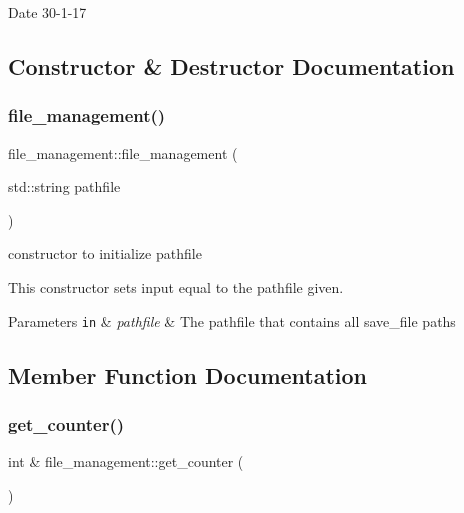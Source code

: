 \begin{DoxyDate}{Date}
30-\/1-\/17 
\end{DoxyDate}


\subsection{Constructor \& Destructor Documentation}
\mbox{\label{classfile__management_ae3d7ca2804b44e05efc2ddc79c9d514d}} 
\subsubsection{\texorpdfstring{file\+\_\+management()}{file\_management()}}
{\footnotesize\ttfamily file\+\_\+management\+::file\+\_\+management (\begin{DoxyParamCaption}\item[{std\+::string}]{pathfile }\end{DoxyParamCaption})}



constructor to initialize pathfile 

This constructor sets input equal to the pathfile given.


\begin{DoxyParams}[1]{Parameters}
\mbox{\tt in}  & {\em pathfile} & The pathfile that contains all save\+\_\+file paths \\
\hline
\end{DoxyParams}


\subsection{Member Function Documentation}
\mbox{\label{classfile__management_ae6291547fab57a5b861c52e970175854}} 
\subsubsection{\texorpdfstring{get\+\_\+counter()}{get\_counter()}}
{\footnotesize\ttfamily int \& file\+\_\+management\+::get\+\_\+counter (\begin{DoxyParamCaption}{ }\end{DoxyParamCaption})}




